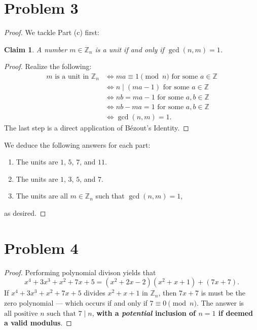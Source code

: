 \documentclass[11pt]{article}
\newtheorem{claim}{Claim}
\begin{document}

\section{Problem 3}

\begin{proof}
  We tackle Part (c) first:
  \begin{adjustwidth}{1cm}{}
  	\begin{claim}
  		A number $m \in \mathbb{Z}_{n}$ is a unit if and only if $\gcd(n, m) = 1$.
  	\end{claim}
  	\begin{proof}\renewcommand{\qedsymbol}{}
  		Realize the following:
  		\begin{align*}
  			m \text{ is a unit in } \mathbb{Z}_{n} &\iff ma \equiv 1 \pmod{n} \text{ for some } a \in \mathbb{Z} \\
  			&\iff n \mid (ma - 1) \text{ for some } a \in \mathbb{Z} \\
  			&\iff nb = ma - 1 \text{ for some } a, b \in \mathbb{Z} \\
  			&\iff nb - ma = 1 \text{ for some } a, b \in \mathbb{Z} \\
  			&\iff \gcd(n, m) = 1.
  		\end{align*}
  		The last step is a direct application of Bézout's Identity.
  	\end{proof}
  \end{adjustwidth}

  We deduce the following answers for each part:
  \begin{enumerate}[label=(\alph*)]
  	\item The units are $1$, $5$, $7$, and $11$.
  	\item The units are $1$, $3$, $5$, and $7$.
  	\item The units are all $m \in \mathbb{Z}_{n}$ such that $\gcd(n, m) = 1$,
  \end{enumerate}
  as desired.
\end{proof}


\section{Problem 4}

\begin{proof}
  Performing polynomial divison yields that
  \[
    x^{4} + 3x^{3} + x^{2} + 7x + 5 = (x^{2} + 2x - 2)(x^{2} + x +1) + (7x + 7).
  \]
  If $x^{4} + 3x^{3} + x^{2} + 7x + 5$ divides $x^{2} + x + 1$ in $\mathbb{Z}_{n}$, then $7x + 7$ is must be the zero polynomial --- which occurs if and only if $7 \equiv 0 \pmod{n}$. The answer is $\boxed{\text{all positive $n$ such that $7 \mid n$}}$, \textbf{with a \textit{potential} inclusion of $n = 1$ if deemed a valid modulus}.
\end{proof}
\end{document}
